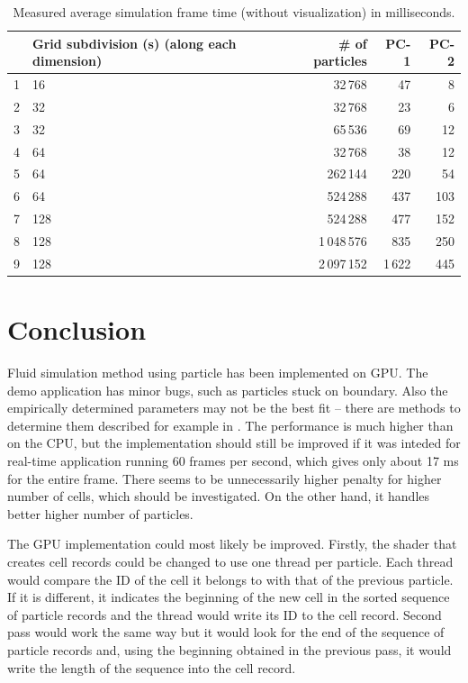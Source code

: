 \documentclass[a4paper,report]{IEEEtran}
\begin{document}
\begin{table}
	\begin{tabularx}{1\linewidth}{r X r r r}
\hline
		& \textbf{Grid subdivision (s)} \newline (along each dimension) & \textbf{\# of particles} & \textbf{PC-1} & \textbf{PC-2} \\
\hline
	1 & 16  & 32\,768 & 47 & 8 \\
	2 & 32  & 32\,768 & 23 & 6 \\
	3 & 32  & 65\,536 & 69 & 12 \\
	4 & 64  & 32\,768 & 38 & 12 \\
	5 & 64  & 262\,144 & 220 & 54 \\
	6 & 64  & 524\,288 & 437 & 103 \\
	7 & 128 & 524\,288 & 477 & 152 \\
	8 & 128 & 1\,048\,576 & 835 & 250 \\
	9 & 128 & 2\,097\,152 & 1\,622 & 445 \\
\hline
\end{tabularx}
	\caption{Measured average simulation frame time (without visualization) in milliseconds.}
	\label{table:results}
\end{table}

\section{Conclusion}
\label{sec:improvements}
Fluid simulation method using particle has been implemented on GPU. The demo application has minor bugs, such as particles stuck on boundary. Also the empirically determined parameters may not be the best fit -- there are methods to determine them described for example in \cite{Articles:Mao}. The performance is much higher than on the CPU, but the implementation should still be improved if it was inteded for real-time application running 60 frames per second, which gives only about 17 ms for the entire frame. There seems to be unnecessarily higher penalty for higher number of cells, which should be investigated. On the other hand, it handles better higher number of particles.

The GPU implementation could most likely be improved. Firstly, the shader that creates cell records could be changed to use one thread per particle. Each thread would compare the ID of the cell it belongs to with that of the previous particle. If it is different, it indicates the beginning of the new cell in the sorted sequence of particle records and the thread would write its ID to the cell record. Second pass would work the same way but it would look for the end of the sequence of particle records and, using the beginning obtained in the previous pass, it would write the length of the sequence into the cell record.
\end{document}
